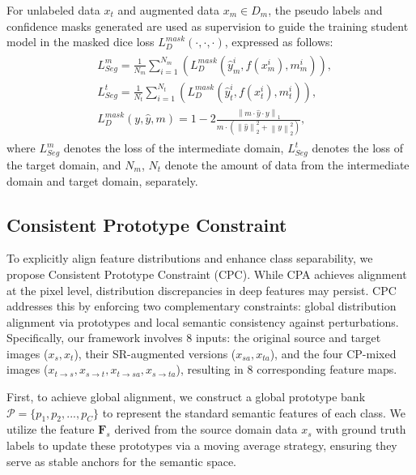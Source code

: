 For unlabeled data $x_{t}$ and augmented data $x_{m} \in D_{m}$, the pseudo labels and confidence masks generated are used as supervision to guide the training student model in the masked dice loss $L_{D}^{mask}(\cdot, \cdot, \cdot)$, expressed as follows:
\begin{align} \label{eq9}
    \begin{split}
         & L_{Seg}^{m} = \frac{1}{N_{m}} \sum_{i=1}^{N_{m}}(L_{D}^{mask}(\hat{y}_{m}^{i}, f(x_{m}^{i}), m_{m}^{i})),  \\
         & L_{Seg}^{t} = \frac{1}{N_{t}} \sum_{i=1}^{N_{t}}(L_{D}^{mask}(\hat{y}_{t}^{i}, f(x_{t}^{i}), m_{t}^{i})),  \\
         & L_{D}^{mask}(y, \hat{y}, m) = 1 - 2 \frac{\left \| m \cdot \hat{y} \cdot y  \right \|_{1}}{ m \cdot (\left \| \hat{y}  \right \|_{2}^{2} + \left \| y  \right \|_{2}^{2})},
    \end{split}
\end{align}
where $L_{Seg}^{m}$ denotes the loss of the intermediate domain, $L_{Seg}^{t}$ denotes the loss of the target domain, and $N_{m}$, $N_{t}$ denote the amount of data from the intermediate domain and target domain, separately.


\subsection{Consistent Prototype Constraint} 
To explicitly align feature distributions and enhance class separability, we propose Consistent Prototype Constraint (CPC). While CPA achieves alignment at the pixel level, distribution discrepancies in deep features may persist. CPC addresses this by enforcing two complementary constraints: global distribution alignment via prototypes and local semantic consistency against perturbations.
Specifically, our framework involves 8 inputs: the original source and target images ($x_s, x_t$), their SR-augmented versions ($x_{sa}, x_{ta}$), and the four CP-mixed images ($x_{t \to s}, x_{s \to t}, x_{t \to sa}, x_{s \to ta}$), resulting in 8 corresponding feature maps.

First, to achieve global alignment, we construct a global prototype bank $\mathcal{P} = \{p_1, p_2, ..., p_C\}$ to represent the standard semantic features of each class. We utilize the feature $\boldsymbol{F}_s$ derived from the source domain data $x_s$ with ground truth labels to update these prototypes via a moving average strategy, ensuring they serve as stable anchors for the semantic space.

